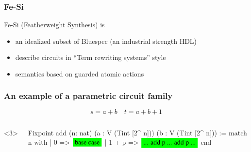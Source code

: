 \documentclass[9pt]{beamer}
\begin{document}
\begin{frame}
  \frametitle{Fe-Si}
  \begin{block}{Fe-Si (Featherweight Synthesis) is}
    \begin{itemize}
    \item an idealized subset of Bluespec (an industrial strength HDL)
    \item describe circuits in ``Term rewriting systems'' style
    \item semantics based on guarded atomic actions
    \end{itemize}
  \end{block}
\end{frame}

\begin{frame}[fragile]
\frametitle{An example of a parametric circuit family}
\begin{center}
\end{center}
\begin{displaymath}
  s =  a + b \quad  t =  a + b + 1
\end{displaymath}
\begin{columns}<3>
   \begin{coq}
Fixpoint add (n: nat) (a : V (Tint [2^ n])) (b : V (Tint [2^ n])) :=
  match n with
    | 0 => $\colorbox{green}{base case}$
    | 1 + p => $\colorbox{green}{... add p ... add p ...}$
  end\end{coq}
\end{columns}
\end{frame}
\end{document}
